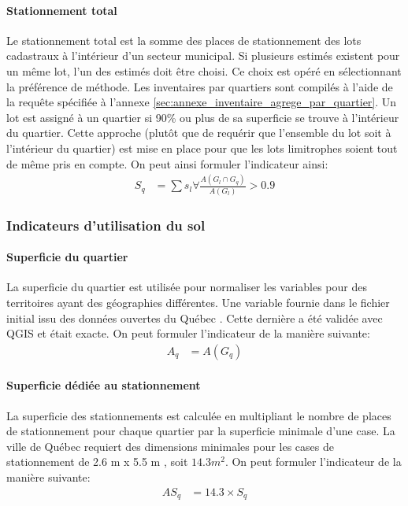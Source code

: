     \paragraph{Stationnement total} Le stationnement total est la somme des places de stationnement des lots cadastraux à l'intérieur d'un secteur municipal. Si plusieurs estimés existent pour un même lot, l'un des estimés doit être choisi. Ce choix est opéré en sélectionnant la préférence de méthode. Les inventaires par quartiers sont compilés à l'aide de la requête spécifiée à l'annexe \ref{sec:annexe_inventaire_agrege_par_quartier}. Un lot est assigné à un quartier si 90\% ou plus de sa superficie se trouve à l'intérieur du quartier. Cette approche (plutôt que de requérir que l'ensemble du lot soit à l'intérieur du quartier) est mise en place pour que les lots limitrophes soient tout de même pris en compte. On peut ainsi formuler l'indicateur ainsi:
    \begin{align}
        S_q &= \sum{s_l} \forall \frac{A\left(G_l\cap G_q\right)}{A\left(G_l\right)}>0.9
    \end{align}
    \subsubsection{Indicateurs d'utilisation du sol}
    \paragraph{Superficie du quartier} La superficie du quartier est utilisée pour normaliser les variables pour des territoires ayant des géographies différentes. Une variable fournie dans le fichier initial issu des données ouvertes du Québec \parencite{ville_de_quebec_quartiers_2024}. Cette dernière a été validée avec QGIS et était exacte. On peut formuler l'indicateur de la manière suivante:
    \begin{align}
        A_q &= A(G_q)
    \end{align}
    \paragraph{Superficie dédiée au stationnement} La superficie des stationnements est calculée en multipliant le nombre de places de stationnement pour chaque quartier par la superficie minimale d'une case. La ville de Québec requiert des dimensions minimales pour les cases de stationnement de 2.6 m x 5.5 m \parencite{ville_de_quebec_normes_2024,ville_de_quebec_normes_2024-1,ville_de_quebec_normes_2024-2,ville_de_quebec_normes_2025,ville_de_quebec_reglement_2009-1}, soit $14.3m^2$. On peut formuler l'indicateur de la manière suivante:
    \begin{align}
        AS_q &= 14.3 \times S_q
    \end{align}
